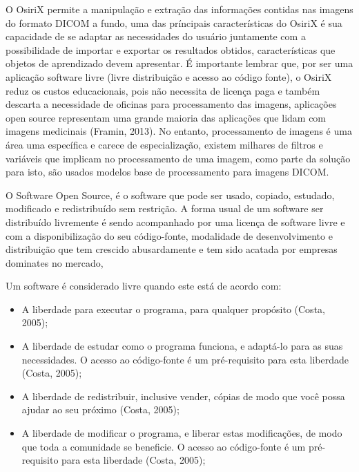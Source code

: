 \documentclass[12pt,openright,oneside,a4paper,english,french,spanish,brazil]{unifil}
\begin{document}
O OsiriX permite a manipulação e extração das informações contidas nas imagens do formato DICOM a fundo, uma das príncipais características do OsiriX é sua capacidade de se adaptar as necessidades do usuário juntamente com a possibilidade de importar e exportar os resultados obtidos, características que objetos de aprendizado devem apresentar. É importante lembrar que, por ser uma aplicação software livre (livre distribuição e acesso ao código fonte), o OsiriX reduz os custos educacionais, pois não necessita de licença paga e também descarta a necessidade de oficinas para processamento das imagens, aplicações open source representam uma grande maioria das aplicações que lidam com imagens medicinais (Framin, 2013). No entanto, processamento de imagens é uma área uma específica e carece de especialização, existem milhares de filtros e variáveis que implicam no processamento de uma imagem, como parte da solução para isto, são usados modelos base de processamento para imagens DICOM.

O Software Open Source, é o software que pode ser usado, copiado, estudado, modificado e redistribuído sem restrição. A forma usual de um software ser distribuído livremente é sendo acompanhado por uma licença de software livre e com a disponibilização do seu código-fonte, modalidade de desenvolvimento e distribuição que tem crescido abusardamente e tem sido acatada por empresas dominates no mercado,

Um software é considerado livre quando este está de acordo com:
\begin{itemize}
\item A liberdade para executar o programa, para qualquer propósito (Costa, 2005);
\item A liberdade de estudar como o programa funciona, e adaptá-lo para as suas necessidades. O acesso ao código-fonte é um pré-requisito para esta liberdade (Costa, 2005);
\item A liberdade de redistribuir, inclusive vender, cópias de modo que você possa ajudar ao seu próximo (Costa, 2005);
\item A liberdade de modificar o programa, e liberar estas modificações, de modo que toda a comunidade se beneficie. O acesso ao código-fonte é um pré-requisito para esta liberdade (Costa, 2005); 
\end{itemize}
\end{document}
